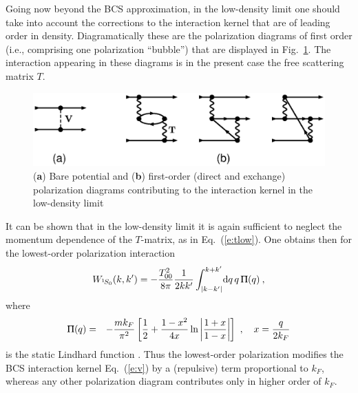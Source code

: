 \documentclass[runningheads]{svmult}
\newcommand{\greeksym}[1]{{\usefont{U}{psy}{m}{n}#1}}
\newcommand{\uPi}{\mbox{\greeksym{P}}}
\newcommand{\be}{\begin{equation}}
\newcommand{\ee}{\end{equation}}
\newcommand{\bea}{\begin{eqnarray}}
\newcommand{\eea}{\end{eqnarray}}
\def\ss{^1\!S_0}
\begin{document}
Going now beyond the BCS approximation, in the low-density limit one 
should take into account the corrections to the interaction kernel
that are of leading order in density. 
Diagramatically these are the polarization diagrams of first
order (i.e., comprising one polarization ``bubble'') that are
displayed in Fig.~\ref{f:pollow}.
The interaction appearing in these diagrams is in the present case
the free scattering matrix $T$. 
\begin{figure}[b] %
\includegraphics[height=0.14\textheight,bb=20 630 20 750]{nsbk_dia.ps}
\caption[]
{({\bf a}) Bare potential and 
({\bf b}) first-order (direct and exchange) polarization diagrams 
contributing to the interaction kernel in the low-density limit}
\label{f:pollow}
\end{figure} %
It can be shown \cite{GMB} that in the low-density limit it is again 
sufficient to 
neglect the momentum dependence of the $T$-matrix, as in Eq.~(\ref{e:tlow}).
One obtains then for the lowest-order polarization interaction
\be
 W_{\ss}(k,k') = -{ T_{00}^2 \over 8\pi} {1\over 2 k k'}
 \int_{|k-k'|}^{k+k'}\! \D q\, q\, \uPi(q) \:,
\ee
where 
\bea
  \uPi(q) &=& 
  -{m k_F \over \pi^2}
  \left[{1\over2} + {1-x^2\over 4x}\ln\left|{1+x\over 1-x}\right| \right] 
  \ ,\quad 
  x = {q\over 2k_F} 
\label{e:pi}
\eea
is the static Lindhard function \cite{FW}.
Thus the lowest-order polarization modifies the 
BCS interaction kernel Eq.~(\ref{e:v})
by a (repulsive) term proportional to $k_F$, 
whereas any other polarization diagram 
contributes only in higher order of $k_F$.
\end{document}
